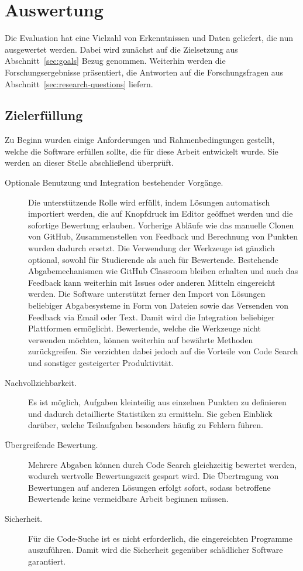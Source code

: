 \chapter{Auswertung}\label{ch:results}

Die Evaluation hat eine Vielzahl von Erkenntnissen und Daten geliefert, die nun ausgewertet werden.
Dabei wird zunächst auf die Zielsetzung aus Abschnitt~\ref{sec:goals} Bezug genommen.
Weiterhin werden die Forschungsergebnisse präsentiert, die Antworten auf die Forschungsfragen aus Abschnitt~\ref{sec:research-questions} liefern.

\section{Zielerfüllung}\label{sec:goals-reached}

Zu Beginn wurden einige Anforderungen und Rahmenbedingungen gestellt, welche die Software erfüllen sollte, die für diese Arbeit entwickelt wurde.
Sie werden an dieser Stelle abschließend überprüft.

\begin{description}
    \item[Optionale Benutzung und Integration bestehender Vorgänge.]
    Die unterstützende Rolle wird erfüllt, indem Lösungen automatisch importiert werden, die auf Knopfdruck im Editor geöffnet werden und die sofortige Bewertung erlauben.
    Vorherige Abläufe wie das manuelle Clonen von GitHub, Zusammenstellen von Feedback und Berechnung von Punkten wurden dadurch ersetzt.
    Die Verwendung der Werkzeuge ist gänzlich optional, sowohl für Studierende als auch für Bewertende.
    Bestehende Abgabemechanismen wie GitHub Classroom bleiben erhalten und auch das Feedback kann weiterhin mit Issues oder anderen Mitteln eingereicht werden.
    Die Software unterstützt ferner den Import von Lösungen beliebiger Abgabesysteme in Form von Dateien sowie das Versenden von Feedback via Email oder Text.
    Damit wird die Integration beliebiger Plattformen ermöglicht.
    Bewertende, welche die Werkzeuge nicht verwenden möchten, können weiterhin auf bewährte Methoden zurückgreifen.
    Sie verzichten dabei jedoch auf die Vorteile von Code Search und sonstiger gesteigerter Produktivität.
    \item[Nachvollziehbarkeit.]
    Es ist möglich, Aufgaben kleinteilig aus einzelnen Punkten zu definieren und dadurch detaillierte Statistiken zu ermitteln.
    Sie geben Einblick darüber, welche Teilaufgaben besonders häufig zu Fehlern führen.
    \item[Übergreifende Bewertung.]
    Mehrere Abgaben können durch Code Search gleichzeitig bewertet werden, wodurch wertvolle Bewertungszeit gespart wird.
    Die Übertragung von Bewertungen auf anderen Lösungen erfolgt sofort, sodass betroffene Bewertende keine vermeidbare Arbeit beginnen müssen.
    \item[Sicherheit.]
    Für die Code-Suche ist es nicht erforderlich, die eingereichten Programme auszuführen.
    Damit wird die Sicherheit gegenüber schädlicher Software garantiert.
\end{description}

